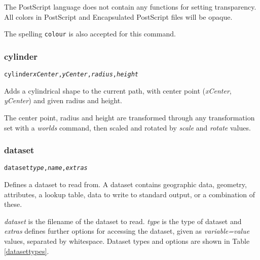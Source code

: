 The PostScript language does not contain any functions for setting
transparency.
All colors in PostScript and Encapsulated PostScript
files will be opaque.

The spelling \texttt{colour} is also accepted for this command.

\subsubsection{cylinder}

\begin{alltt}
cylinder \textit{xCenter}, \textit{yCenter}, \textit{radius}, \textit{height}
\end{alltt}

Adds a cylindrical shape to the current path, with center
point (\textit{xCenter}, \textit{yCenter}) and given radius and height.

The center point, radius and height are transformed through any
transformation set with a \textit{worlds} command,
then scaled and rotated by \textit{scale}
and \textit{rotate} values.

\subsubsection{dataset}

\begin{alltt}
dataset \textit{type}, \textit{name}, \textit{extras}
\end{alltt}

Defines a dataset to read from.  A dataset contains geographic data,
geometry, attributes, a lookup table, data to write to standard
output, or a combination of these.

\textit{dataset} is the filename of the dataset to read.
\textit{type} is the type of dataset and
\textit{extras} defines further options for accessing the dataset, given
as \textit{variable=value} values, separated by whitespace.
Dataset types and options are shown in Table \ref{datasettypes}.


